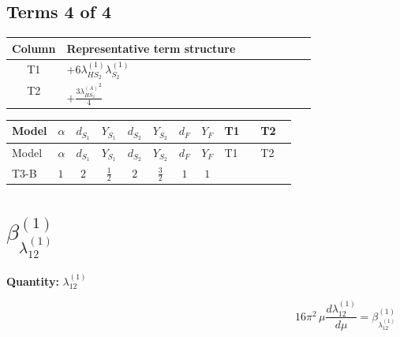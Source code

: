 \documentclass[8pt]{article}
\begin{document}
\begin{landscape}
\subsection*{Terms 4 of 4}
\begin{center}
\begin{tabular}{@{}c >{\raggedright\arraybackslash}p{0.82\linewidth}@{}}
\toprule
Column & Representative term structure \\
\midrule
T1 & \(\displaystyle +6 {\lambda_{HS_2}^{(1)}} {\lambda_{S_2}^{(1)}}\) \\
\midrule
T2 & \(\displaystyle +\frac{3 {\lambda_{HS_2}^{(A)}}^2}{4}\) \\
\midrule
\bottomrule
\end{tabular}
\end{center}
\smallskip
\tiny
\begin{longtable}{@{}llcccccc >{\raggedright\arraybackslash}p{0.21\linewidth} >{\raggedright\arraybackslash}p{0.21\linewidth}@{}}
\toprule
Model & $\alpha$ & $d_{S_1}$ & $Y_{S_1}$ & $d_{S_2}$ & $Y_{S_2}$ & $d_F$ & $Y_F$ & T1 & T2 \\
\midrule
\endfirsthead
\toprule
Model & $\alpha$ & $d_{S_1}$ & $Y_{S_1}$ & $d_{S_2}$ & $Y_{S_2}$ & $d_F$ & $Y_F$ & T1 & T2 \\
\midrule
\endhead
T3-B & $1$ & $2$ & $\frac{1}{2}$ & $2$ & $\frac{3}{2}$ & $1$ & $1$ & \scriptsize\adjustbox{max width=\linewidth}{$\begin{gathered} +6 {\lambda_{HS_2}^{(1)}} {\lambda_{S_2}^{(1)}}\end{gathered}$} & \scriptsize\adjustbox{max width=\linewidth}{$\begin{gathered} +\frac{3 {\lambda_{HS_2}^{(A)}}^2}{4}\end{gathered}$} \\
\midrule
\bottomrule
\end{longtable}
\clearpage
\section*{$\beta_{\lambda_{12}^{(1)}}^{(1)}$}
\noindent\textbf{Quantity: }$\lambda_{12}^{(1)}$\par\smallskip
\[16\pi^2\,\mu\frac{d \lambda_{12}^{(1)}}{d\mu}=\beta_{\lambda_{12}^{(1)}}^{(1)}\]

\end{landscape}
\end{document}
